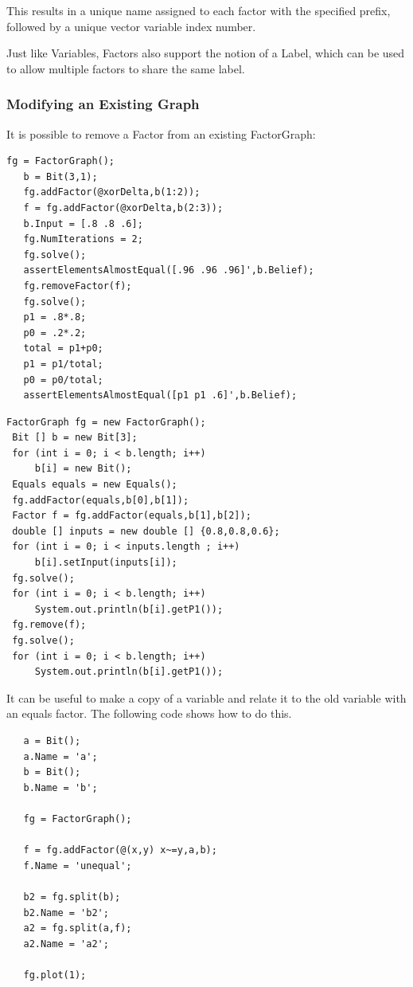 This results in a unique name assigned to each factor with the specified prefix, followed by a unique vector variable index number.

\fi

Just like Variables, Factors also support the notion of a Label, which can be used to allow multiple factors to share the same label.

\subsubsection{Modifying an Existing Graph}


It is possible to remove a Factor from an existing FactorGraph:

\ifmatlab

\begin{lstlisting}
fg = FactorGraph();
   b = Bit(3,1);
   fg.addFactor(@xorDelta,b(1:2));
   f = fg.addFactor(@xorDelta,b(2:3));
   b.Input = [.8 .8 .6];
   fg.NumIterations = 2;
   fg.solve();
   assertElementsAlmostEqual([.96 .96 .96]',b.Belief);
   fg.removeFactor(f);
   fg.solve();
   p1 = .8*.8;
   p0 = .2*.2;
   total = p1+p0;
   p1 = p1/total;
   p0 = p0/total;
   assertElementsAlmostEqual([p1 p1 .6]',b.Belief);
\end{lstlisting}

\fi

\ifjava

\begin{lstlisting}
FactorGraph fg = new FactorGraph();
 Bit [] b = new Bit[3];
 for (int i = 0; i < b.length; i++)
	 b[i] = new Bit();
 Equals equals = new Equals();
 fg.addFactor(equals,b[0],b[1]);
 Factor f = fg.addFactor(equals,b[1],b[2]);
 double [] inputs = new double [] {0.8,0.8,0.6};
 for (int i = 0; i < inputs.length ; i++)
	 b[i].setInput(inputs[i]);
 fg.solve();
 for (int i = 0; i < b.length; i++)
	 System.out.println(b[i].getP1());
 fg.remove(f);
 fg.solve();
 for (int i = 0; i < b.length; i++)
	 System.out.println(b[i].getP1());
\end{lstlisting}
\fi


It can be useful to make a copy of a variable and relate it to the old variable with an equals factor. The following code shows how to do this.

\ifmatlab

\begin{lstlisting}
   a = Bit();
   a.Name = 'a';
   b = Bit();
   b.Name = 'b';
  
   fg = FactorGraph();
  
   f = fg.addFactor(@(x,y) x~=y,a,b);
   f.Name = 'unequal';
   
   b2 = fg.split(b);
   b2.Name = 'b2';
   a2 = fg.split(a,f);
   a2.Name = 'a2';
   
   fg.plot(1);
\end{lstlisting}

